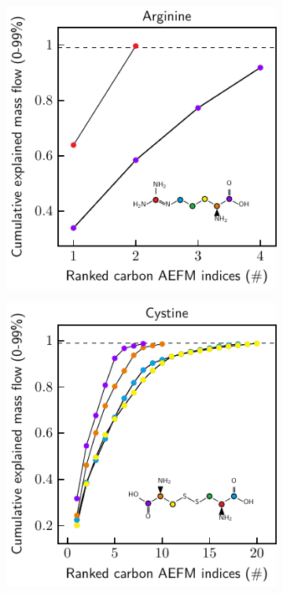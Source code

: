 \documentclass[]{article}
\begin{document}
\begin{figure}
    \begin{subfigure}[t]{0.247\textwidth}
        \caption{}
        \includegraphics[width=\textwidth]{subpanels/cumulative-source-met-6-legend.pdf}\\
    \end{subfigure}
    \begin{subfigure}[t]{0.247\textwidth}
        \caption{}
        \includegraphics[width=\textwidth]{subpanels/cumulative-source-met-10-legend.pdf}\\

\end{subfigure}
\end{figure}
\end{document}
